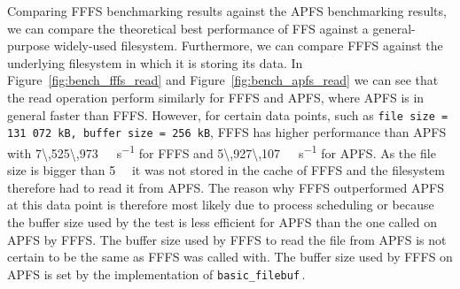 Comparing \gls{FFFS} benchmarking results against the \gls{APFS} benchmarking results, we can compare the theoretical best performance of \gls{FFS} against a \mbox{general-purpose} \mbox{widely-used} filesystem. Furthermore, we can compare \gls{FFFS} against the underlying filesystem in which it is storing its data. In Figure~\ref{fig:bench_fffs_read} and Figure~\ref{fig:bench_apfs_read} we can see that the read operation perform similarly for \gls{FFFS} and \gls{APFS}, where \gls{APFS} is in general faster than \gls{FFFS}. However, for certain data points, such as \texttt{file size = 131\,072\,kB, buffer size = 256\,kB}, \gls{FFFS} has higher performance than \gls{APFS} with \SI[per-mode = symbol]{7\,525\,973}{\kilo\byte\per\second} for \gls{FFFS} and \SI[per-mode = symbol]{5\,927\,107}{\kilo\byte\per\second} for \gls{APFS}. As the file size is bigger than \SI{5}{\mega\byte} it was not stored in the cache of \gls{FFFS} and the filesystem therefore had to read it from \gls{APFS}. The reason why \gls{FFFS} outperformed \gls{APFS} at this data point is therefore most likely due to process scheduling or because the buffer size used by the test is less efficient for \gls{APFS} than the one called on \gls{APFS} by \gls{FFFS}. The buffer size used by \gls{FFFS} to read the file from \gls{APFS} is not certain to be the same as \gls{FFFS} was called with. The buffer size used by \gls{FFFS} on \gls{APFS} is set by the implementation of \texttt{basic\_filebuf}\,\cite{cppreference.comStdBasicFilebuf2020}.

